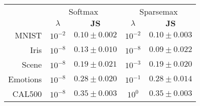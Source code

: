 \begin{tabular}{r|cc|cc}
& \multicolumn{2}{c|}{Softmax} & \multicolumn{2}{c}{Sparsemax} \\
& $\lambda$ & $\mathbf{JS}$ & $\lambda$ & $\mathbf{JS}$ \\
\hline
MNIST & $10^{-2}$ & $0.10 \pm 0.002$ & $10^{-2}$ & $0.10 \pm 0.003$ \\
Iris & $10^{-8}$ & $0.13 \pm 0.010$ & $10^{-8}$ & $0.09 \pm 0.022$ \\
Scene & $10^{-8}$ & $0.19 \pm 0.021$ & $10^{-3}$ & $0.19 \pm 0.020$ \\
Emotions & $10^{-8}$ & $0.28 \pm 0.020$ & $10^{-1}$ & $0.28 \pm 0.014$ \\
CAL500 & $10^{-8}$ & $0.35 \pm 0.003$ & $10^{0}$ & $0.35 \pm 0.003$ \\
\end{tabular}

